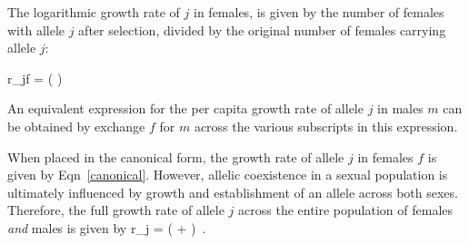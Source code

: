 \documentclass[12pt]{article}
\let\oldequation\equation
\let\oldendequation\endequation
\renewenvironment{equation}
  {\linenomathNonumbers\oldequation}
  {\oldendequation\endlinenomath}
\begin{document}
The logarithmic growth rate of $j$ in females, is given by the number of females with allele $j$ after selection, divided by the original number of females carrying allele $j$:



\begin{equation}
    r_{jf} = \ln \left(  \right)
    \label{canonical}
\end{equation}


An equivalent expression for the per capita growth rate of allele $j$ in males $m$ can be obtained by exchange $f$ for $m$ across the various subscripts in this expression.

When placed in the canonical form, the growth rate of allele $j$ in females $f$ is given by Eqn~\ref{canonical}. However, allelic coexistence in a sexual population is ultimately influenced by growth and establishment of an allele across both sexes. Therefore, the full growth rate of allele $j$ across the entire population of females \emph{and} males is given by
\begin{equation}
    r_{j} = \ln \left(     +    \right) \,.
    \label{full}
\end{equation}

\end{document}
